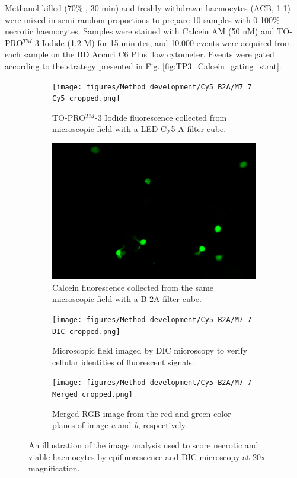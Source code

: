 Methanol-killed (70\% , 30 min) and freshly withdrawn haemocytes (ACB, 1:1) were mixed in semi-random proportions to prepare 10 samples with 0-100\% necrotic haemocytes. Samples were stained with Calcein AM (50 nM) and TO-PRO$^{TM}$-3 Iodide (1.2 \micro M) for 15 minutes, and 10.000 events were acquired from each sample on the BD Accuri C6 Plus flow cytometer. Events were gated according to the strategy presented in Fig. \ref{fig:TP3_Calcein_gating_strat}.

\begin{figure}[H]
    \centering
    \begin{subfigure}[b]{.45\textwidth}
        \centering
        \texttt{[image: figures/Method development/Cy5 B2A/M7 7 Cy5 cropped.png]}
        \caption{TO-PRO$^{TM}$-3 Iodide fluorescence collected from microscopic field with a LED-Cy5-A filter cube.}
        \label{subfig:a}
    \end{subfigure}
    \hfill
    \begin{subfigure}[b]{.45\textwidth}
        \centering
        \includegraphics[width=\textwidth]{figures/Method development/Cy5 B2A/M7 7 B2A cropped.png}
        \caption{Calcein fluorescence collected from the same microscopic field with a B-2A filter cube.}
        \label{subfig:b}
    \end{subfigure}
    \newline
    \begin{subfigure}[b]{.45\textwidth}
        \centering
        \texttt{[image: figures/Method development/Cy5 B2A/M7 7 DIC cropped.png]}
        \caption{Microscopic field imaged by DIC microscopy to verify cellular identities of fluorescent signals.}
        \label{subfig:c}
    \end{subfigure}
    \hfill
    \begin{subfigure}[b]{.45\textwidth}
        \centering
        \texttt{[image: figures/Method development/Cy5 B2A/M7 7 Merged cropped.png]}
        \caption{Merged RGB image from the red and green color planes of image \emph{a} and \emph{b}, respectively.}
        \label{subfig:d}
    \end{subfigure}
    \caption{An illustration of the image analysis used to score necrotic and viable haemocytes by epifluorescence and DIC microscopy at 20x magnification.}
    \label{fig:Epifluorescent_scoring}
\end{figure}


